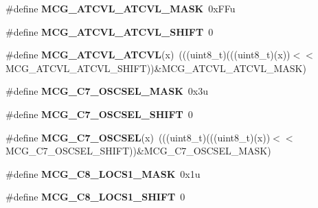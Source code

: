 \begin{DoxyCompactItemize}
\item 
\#define {\bfseries M\+C\+G\+\_\+\+A\+T\+C\+V\+L\+\_\+\+A\+T\+C\+V\+L\+\_\+\+M\+A\+SK}~0x\+F\+Fu\hypertarget{group__MCG__Register__Masks_ga48750526150212b524f731e303a7e3cf}{}\label{group__MCG__Register__Masks_ga48750526150212b524f731e303a7e3cf}

\item 
\#define {\bfseries M\+C\+G\+\_\+\+A\+T\+C\+V\+L\+\_\+\+A\+T\+C\+V\+L\+\_\+\+S\+H\+I\+FT}~0\hypertarget{group__MCG__Register__Masks_ga9e3e0eab24aaf1bf2905ae0cf4803eb3}{}\label{group__MCG__Register__Masks_ga9e3e0eab24aaf1bf2905ae0cf4803eb3}

\item 
\#define {\bfseries M\+C\+G\+\_\+\+A\+T\+C\+V\+L\+\_\+\+A\+T\+C\+VL}(x)~(((uint8\+\_\+t)(((uint8\+\_\+t)(x))$<$$<$M\+C\+G\+\_\+\+A\+T\+C\+V\+L\+\_\+\+A\+T\+C\+V\+L\+\_\+\+S\+H\+I\+FT))\&M\+C\+G\+\_\+\+A\+T\+C\+V\+L\+\_\+\+A\+T\+C\+V\+L\+\_\+\+M\+A\+SK)\hypertarget{group__MCG__Register__Masks_ga124aa7c8cc26cfd1c06a278add1a0d21}{}\label{group__MCG__Register__Masks_ga124aa7c8cc26cfd1c06a278add1a0d21}

\item 
\#define {\bfseries M\+C\+G\+\_\+\+C7\+\_\+\+O\+S\+C\+S\+E\+L\+\_\+\+M\+A\+SK}~0x3u\hypertarget{group__MCG__Register__Masks_ga8f29d6e2e3ddd8725de2ea86d8f0548f}{}\label{group__MCG__Register__Masks_ga8f29d6e2e3ddd8725de2ea86d8f0548f}

\item 
\#define {\bfseries M\+C\+G\+\_\+\+C7\+\_\+\+O\+S\+C\+S\+E\+L\+\_\+\+S\+H\+I\+FT}~0\hypertarget{group__MCG__Register__Masks_ga36e349718cb5e8af96efea408f059dcb}{}\label{group__MCG__Register__Masks_ga36e349718cb5e8af96efea408f059dcb}

\item 
\#define {\bfseries M\+C\+G\+\_\+\+C7\+\_\+\+O\+S\+C\+S\+EL}(x)~(((uint8\+\_\+t)(((uint8\+\_\+t)(x))$<$$<$M\+C\+G\+\_\+\+C7\+\_\+\+O\+S\+C\+S\+E\+L\+\_\+\+S\+H\+I\+FT))\&M\+C\+G\+\_\+\+C7\+\_\+\+O\+S\+C\+S\+E\+L\+\_\+\+M\+A\+SK)\hypertarget{group__MCG__Register__Masks_gac1a1e06d2189b74b5587b53d3104cb4a}{}\label{group__MCG__Register__Masks_gac1a1e06d2189b74b5587b53d3104cb4a}

\item 
\#define {\bfseries M\+C\+G\+\_\+\+C8\+\_\+\+L\+O\+C\+S1\+\_\+\+M\+A\+SK}~0x1u\hypertarget{group__MCG__Register__Masks_ga1417ca27a647ced3cdfc504a604f8dc8}{}\label{group__MCG__Register__Masks_ga1417ca27a647ced3cdfc504a604f8dc8}

\item 
\#define {\bfseries M\+C\+G\+\_\+\+C8\+\_\+\+L\+O\+C\+S1\+\_\+\+S\+H\+I\+FT}~0\hypertarget{group__MCG__Register__Masks_ga648e426b4d1f976cca5229505a26d9a8}{}\label{group__MCG__Register__Masks_ga648e426b4d1f976cca5229505a26d9a8}


\end{DoxyCompactItemize}
